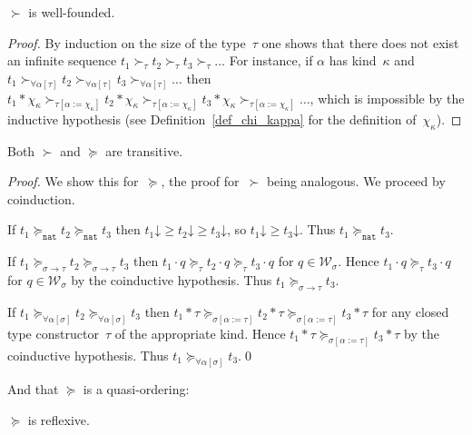 \documentclass[runningheads,a4paper]{llncs}
\newcommand{\World}{\mathcal{W}}
\newcommand{\arrtype}{\rightarrow}
\newcommand{\app}[2]{#1 \cdot #2}
\newcommand{\tapp}[2]{#1 * #2}
\newcommand{\subst}[2]{#1:=#2}
\newcommand{\nat}{\mathtt{nat}}
\newcommand{\da}{\mathord{\downarrow}}
\begin{document}
\begin{lemma}
$\succ$ is well-founded.
\end{lemma}

\begin{proof}
  By induction on the size of the type~$\tau$ one shows that there
  does not exist an infinite sequence
  $t_1 \succ_\tau t_2 \succ_\tau t_3 \succ_\tau \ldots$ For instance,
  if $\alpha$ has kind~$\kappa$ and
  $t_1 \succ_{\forall\alpha[\tau]} t_2 \succ_{\forall\alpha[\tau]} t_3
  \succ_{\forall\alpha[\tau]} \ldots$ then
  $\tapp{t_1}{\chi_\kappa} \succ_{\tau[\subst{\alpha}{\chi_\kappa}]}
  \tapp{t_2}{\chi_\kappa} \succ_{\tau[\subst{\alpha}{\chi_\kappa}]}
  \tapp{t_3}{\chi_\kappa} \succ_{\tau[\subst{\alpha}{\chi_\kappa}]}
  \ldots$, which is impossible by the inductive hypothesis (see
  Definition~\ref{def_chi_kappa} for the definition of~$\chi_\kappa$).
\end{proof}

\begin{lemma}
Both $\succ$ and $\succeq$ are transitive.
\end{lemma}

\begin{proof}
  We show this for~$\succeq$, the proof for~$\succ$ being
  analogous. We proceed by coinduction.

  If $t_1 \succeq_\nat t_2 \succeq_\nat t_3$ then
  $t_1\da \ge t_2\da \ge t_3\da$, so $t_1\da \ge t_3\da$. Thus
  $t_1 \succeq_\nat t_3$.

  If $t_1 \succeq_{\sigma\arrtype\tau}t_2\succeq_{\sigma\arrtype\tau}t_3$ then
  $\app{t_1}{q}\succeq_{\tau}\app{t_2}{q}\succeq_\tau\app{t_3}{q}$ for
  $q \in \World_\sigma$. Hence $\app{t_1}{q}\succeq_\tau\app{t_3}{q}$
  for $q \in \World_\sigma$ by the coinductive hypothesis. Thus
  $t_1\succeq_{\sigma\arrtype\tau} t_3$.

  If $t_1
  \succeq_{\forall\alpha[\sigma]}t_2\succeq_{\forall\alpha[\sigma]}t_3$
  then
  $\tapp{t_1}{\tau}\succeq_{\sigma[\subst{\alpha}{\tau}]}\tapp{t_2}{\tau}\succeq_{\sigma[\subst{\alpha}{\tau}]}\tapp{t_3}{\tau}$
  for any closed type constructor~$\tau$ of the appropriate kind. Hence
  $\tapp{t_1}{\tau}\succeq_{\sigma[\subst{\alpha}{\tau}]}\tapp{t_3}{\tau}$
  by the coinductive hypothesis. Thus
  $t_1\succeq_{\forall\alpha[\sigma]} t_3$.\qed
\end{proof}

And that $\succeq$ is a quasi-ordering:

\begin{lemma}
$\succeq$ is reflexive.
\end{lemma}
\end{document}
